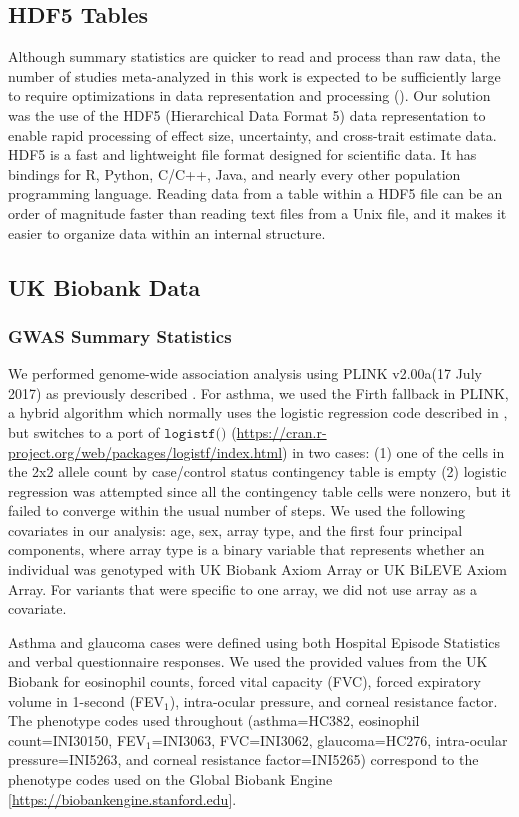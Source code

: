 \subsection*{HDF5 Tables}
Although summary statistics are quicker to read and process than raw data, the number of studies meta-analyzed in this work is expected to be sufficiently large to require optimizations in data representation and processing (). Our solution was the use of the HDF5 (Hierarchical Data Format 5) data representation to enable rapid processing of effect size, uncertainty, and cross-trait estimate data. HDF5 is a fast and lightweight file format designed for scientific data. It has bindings for R, Python, C/C++, Java, and nearly every other population programming language. Reading data from a table within a HDF5 file can be an order of magnitude faster than reading text files from a Unix file, and it makes it easier to organize data within an internal structure.

\subsection*{UK Biobank Data}
\subsubsection*{GWAS Summary Statistics}
We performed genome-wide association analysis using PLINK v2.00a(17 July 2017) as previously described \cite{DeBoever179762}. For asthma, we used the Firth fallback in PLINK, a hybrid algorithm which normally uses the logistic regression code described in \cite{hill2017stepwise}, but switches to a port of $\texttt{logistf()}$ (\url{https://cran.r-project.org/web/packages/logistf/index.html}) in two cases: (1) one of the cells in the 2x2 allele count by case/control status contingency table is empty (2) logistic regression was attempted since all the contingency table cells were nonzero, but it failed to converge within the usual number of steps. We used the following covariates in our analysis: age, sex, array type, and the first four principal components, where array type is a binary variable that represents whether an individual was genotyped with UK Biobank Axiom Array or UK BiLEVE Axiom Array. For variants that were specific to one array, we did not use array as a covariate. 

Asthma and glaucoma cases were defined using both Hospital Episode Statistics and verbal questionnaire responses. We used the provided values from the UK Biobank for eosinophil counts, forced vital capacity (FVC), forced expiratory volume in 1-second (FEV$_1$), intra-ocular pressure, and corneal resistance factor. The phenotype codes used throughout (asthma=HC382, eosinophil count=INI30150, FEV$_1$=INI3063, FVC=INI3062, glaucoma=HC276, intra-ocular pressure=INI5263, and corneal resistance factor=INI5265) correspond to the phenotype codes used on the Global Biobank Engine [\url{https://biobankengine.stanford.edu}].

